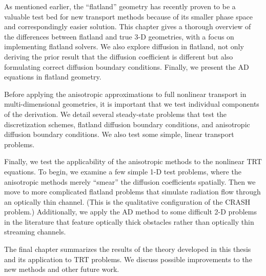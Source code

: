 As mentioned earlier, the ``flatland'' geometry has recently proven to be a
valuable test bed for new transport methods because of its smaller phase space
and correspondingly easier solution. This chapter gives a thorough overview of
the differences between flatland and true 3-D geometries, with a focus on
implementing flatland solvers. We also explore diffusion in flatland, not only
deriving the prior result that the diffusion coefficient is different but also
formulating correct diffusion boundary conditions. Finally, we present the AD
equations in flatland geometry.

Before applying the anisotropic approximations to full nonlinear transport in
multi-dimensional geometries, it is important that we test individual components
of the derivation. We detail several steady-state problems that test the
discretization schemes, flatland diffusion boundary conditions, and anisotropic
diffusion boundary conditions. We also test some simple, linear transport
problems.

Finally, we test the applicability of the anisotropic methods to the nonlinear
TRT equations. To begin, we examine a few simple 1-D test problems, where the
anisotropic methods merely ``smear'' the diffusion coefficients spatially. Then
we move to more complicated flatland problems that simulate radiation flow
through an optically thin channel. (This is the qualitative configuration of
the CRASH problem.)
Additionally, we apply the AD method to some difficult 2-D problems in the
literature that feature optically thick obstacles rather than optically thin
streaming channels.

The final chapter summarizes the results of the theory developed in this thesis
and its application to TRT problems. We discuss possible improvements to the new
methods and other future work.

